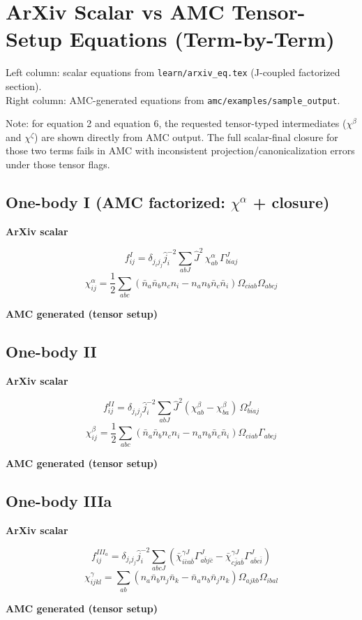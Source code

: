 \documentclass[11pt]{article}
\newcommand{\CompareBlock}[3]{%
\subsection*{#1}
\noindent
\begin{minipage}[t]{0.48\textwidth}
\textbf{ArXiv scalar}
#2
\end{minipage}\hfill
\begin{minipage}[t]{0.48\textwidth}
\textbf{AMC generated (tensor setup)}

\end{minipage}
\vspace{1em}
}
\begin{document}
\small

\section*{ArXiv Scalar vs AMC Tensor-Setup Equations (Term-by-Term)}

Left column: scalar equations from \texttt{learn/arxiv_eq.tex} (J-coupled factorized section).\\
Right column: AMC-generated equations from \texttt{amc/examples/sample_output}.

Note: for equation 2 and equation 6, the requested tensor-typed intermediates ($\chi^{\beta}$ and $\chi^{\zeta}$) are shown directly from AMC output. The full scalar-final closure for those two terms fails in AMC with inconsistent projection/canonicalization errors under those tensor flags.

\CompareBlock{One-body I (AMC factorized: $\chi^{\alpha}$ + closure)}{
\begin{equation*}
 f^{I}_{ij}=\delta_{j_i j_j}\hat j_i^{-2}\sum_{abJ}\hat J^2\,\chi^{\alpha}_{ab}\,\Gamma^J_{biaj}
\end{equation*}
\begin{equation*}
 \chi^{\alpha}_{ij}=\frac12\sum_{abc}\left(\bar n_a\bar n_b n_c n_i-n_a n_b\bar n_c\bar n_i\right)\Omega_{ciab}\Omega_{abcj}
\end{equation*}
}{amc_eq_snippets_clean/dc_f1_tensor_clean_body.tex}

\CompareBlock{One-body II}{
\begin{equation*}
 f^{II}_{ij}=\delta_{j_i j_j}\hat j_i^{-2}\sum_{abJ}\hat J^2(\chi^{\beta}_{ab}-\chi^{\beta}_{ba})\,\Omega^J_{biaj}
\end{equation*}
\begin{equation*}
 \chi^{\beta}_{ij}=\frac12\sum_{abc}\left(\bar n_a\bar n_b n_c n_i-n_a n_b\bar n_c\bar n_i\right)\Omega_{ciab}\Gamma_{abcj}
\end{equation*}
}{amc_eq_snippets_clean/dc_f2_chibeta_tensor_only_body.tex}

\CompareBlock{One-body IIIa}{
\begin{equation*}
 f^{III_a}_{ij}=\delta_{j_i j_j}\hat j_i^{-2}\sum_{abcJ}
\left(\bar\chi^{\gamma J}_{i\bar c a\bar b}\Gamma^J_{a\bar b j\bar c}-\bar\chi^{\gamma J}_{c\bar j a\bar b}\Gamma^J_{a\bar b c\bar i}\right)
\end{equation*}
\begin{equation*}
 \chi^{\gamma}_{ijkl}=\sum_{ab}\left(n_a\bar n_b n_j\bar n_k-\bar n_a n_b\bar n_j n_k\right)\Omega_{ajkb}\Omega_{ibal}
\end{equation*}
}{amc_eq_snippets_clean/dc_f3a_tensor_clean_body.tex}
\end{document}
